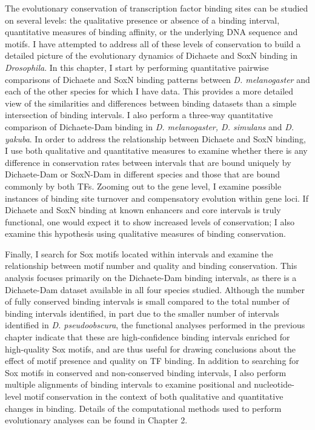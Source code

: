The evolutionary conservation of transcription factor binding sites can be studied on several levels: the qualitative presence or absence of a binding interval, quantitative measures of binding affinity, or the underlying DNA sequence and motifs. I have attempted to address all of these levels of conservation to build a detailed picture of the evolutionary dynamics of Dichaete and SoxN binding in \emph{Drosophila}. In this chapter, I start by performing quantitative pairwise comparisons of Dichaete and SoxN binding patterns between \emph{D. melanogaster} and each of the other species for which I have data. This provides a more detailed view of the similarities and differences between binding datasets than a simple intersection of binding intervals. I also perform a three-way quantitative comparison of Dichaete-Dam binding in \emph{D. melanogaster, D. simulans} and \emph{D. yakuba}. In order to address the relationship between Dichaete and SoxN binding, I use both qualitative and quantitative measures to examine whether there is any difference in conservation rates between intervals that are bound uniquely by Dichaete-Dam or SoxN-Dam in different species and those that are bound commonly by both TFs. Zooming out to the gene level, I examine possible instances of binding site turnover and compensatory evolution within gene loci. If Dichaete and SoxN binding at known enhancers and core intervals is truly functional, one would expect it to show increased levels of conservation; I also examine this hypothesis using qualitative measures of binding conservation.

Finally, I search for Sox motifs located within intervals and examine the relationship between motif number and quality and binding conservation. This analysis focuses primarily on the Dichaete-Dam binding intervals, as there is a Dichaete-Dam dataset available in all four species studied. Although the number of fully conserved binding intervals is small compared to the total number of binding intervals identified, in part due to the smaller number of intervals identified in \emph{D. pseudoobscura}, the functional analyses performed in the previous chapter indicate that these are high-confidence binding intervals enriched for high-quality Sox motifs, and are thus useful for drawing conclusions about the effect of motif presence and quality on TF binding. In addition to searching for Sox motifs in conserved and non-conserved binding intervals, I also perform multiple alignments of binding intervals to examine positional and nucleotide-level motif conservation in the context of both qualitative and quantitative changes in binding. Details of the computational methods used to perform evolutionary analyses can be found in Chapter 2.

